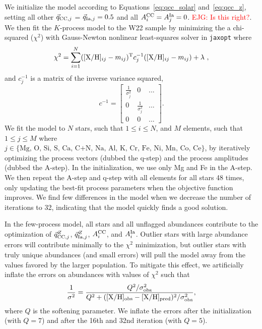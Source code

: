 \documentclass[modern]{aastex631}
\newcommand{\xh}{[{\rm X}/{\rm H}]}
\newcommand{\qcc}{\vec{q}_{{\rm CC,}j}^{Z}}
\newcommand{\qIa}{\vec{q}_{{\rm Ia,}j}^{Z}}
\newcommand{\Acc}{A^{\rm CC}_{i}}
\newcommand{\AIa}{A^{\rm Ia}_{i}}
\newcommand{\ejg}[1]{\textcolor{red}{EJG: #1}}
\begin{document}
We initialize the model according to Equations~\ref{eq:qcc_solar} and~\ref{eq:qcc_z}, setting all other $\vec{q}_{{\rm CC,}j}$ = $\vec{q}_{{\rm Ia,}j} = 0.5$ and all $A_i^{\rm CC} = A_j^{\rm Ia} = 0$. \ejg{Is this right?}. We then fit the $K$-process model to the W22 sample by minimizing the a chi-squared ($\chi^2$) with Gauss-Newton nonlinear least-squares solver in \texttt{jaxopt} where
\begin{equation}
    \chi^2 = \sum_{i=1}^{N} (\xh_{ij} - m_{ij})^{\rm T} c_j^{-1} (\xh_{ij} - m_{ij}) + \lambda~,
\end{equation}
and $c_j^{-1}$ is a matrix of the inverse variance squared,
\begin{equation}
    c^{-1} = \begin{bmatrix}
\frac{1}{\sigma_j^2} & 0 & ...\\
0 & \frac{1}{\sigma_j^2} & ... \\
0 & 0 & ... 
\end{bmatrix} .
\end{equation}
We fit the model to $N$ stars, such that $1 \leq i \leq N$, and $M$ elements, such that $1 \leq j \leq M$ where $j \in \{ \text{Mg, O, Si, S, Ca, C+N, Na, Al, K, Cr, Fe, Ni, Mn, Co, Ce} \}$, by iteratively optimizing the process vectors (dubbed the q-step) and the process amplitudes (dubbed the A-step). In the initialization, we use only Mg and Fe in the A-step. We then repeat the A-step and q-step with all elements for all stars 48 times, only updating the best-fit process parameters when the objective function improves. We find few differences in the model when we decrease the number of iterations to 32, indicating that the model quickly finds a good solution.

In the few-process model, all stars and all unflagged abundances contribute to the optimization of $\qcc$, $\qIa$, $\Acc$, and $\AIa$. Outlier stars with large abundance errors will contribute minimally to the $\chi^2$ minimization, but outlier stars with truly unique abundances (and small errors) will pull the model away from the values favored by the larger population. To mitigate this effect, we artificially inflate the errors on abundances with values of $\chi^2$ such that 
\begin{equation}\label{eq:inflate_ivar}
    \frac{1}{\sigma^2} = \frac{Q^2/\sigma_{\rm obs}^2}{Q^2 + (\xh_{\rm obs} - \xh_{\rm pred})^2 /\sigma_{\rm obs}^2 },    
\end{equation}
where $Q$ is the softening parameter. We inflate the errors after the initialization (with $Q=7$) and after the 16th and 32nd iteration (with $Q=5$). 
\end{document}
